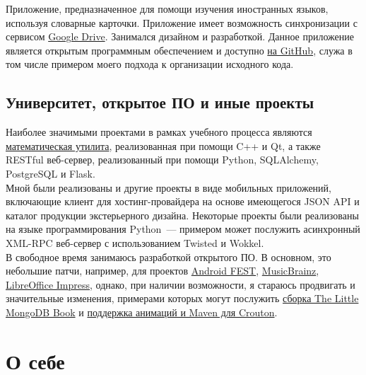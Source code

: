         Приложение, предназначенное для помощи изучения иностранных языков,
        используя словарные карточки. Приложение имеет возможность
        синхронизации с сервисом \href{https://drive.google.com}{Google Drive}.
        Занимался дизайном
        и разработкой. Данное приложение является открытым программным обеспечением
        и доступно \href{https://github.com/ming13/gambit}{на GitHub},
        служа в том числе примером моего подхода к организации исходного кода.

    \subsection*{Университет, открытое ПО и иные проекты}

      Наиболее значимыми проектами в рамках учебного процесса являются
      \href{https://github.com/ming13/aequatio}{математическая утилита},
      реализованная при помощи C++ и Qt, а также RESTful веб-сервер, реализованный
      при помощи Python, SQLAlchemy, PostgreSQL и Flask. \\

      Мной были реализованы и другие проекты в виде мобильных приложений,
      включающие клиент для хостинг-провайдера на основе имеющегося
      JSON API и каталог продукции экстерьерного дизайна.
      Некоторые проекты были реализованы на языке программирования Python~--- примером может послужить
      асинхронный XML-RPC веб-сервер с использованием Twisted и Wokkel. \\

      В свободное время занимаюсь разработкой открытого ПО.
      В основном, это небольшие патчи, например, для проектов
      \href{https://github.com/square/fest-android/commits?author=ming13}{Android FEST},
      \href{https://github.com/jdamcd/musicbrainz-android/commits?author=ming13}{MusicBrainz},
      \href{https://gerrit.libreoffice.org/#/q/owner:%22Artur+Dryomov%22+status:closed,n,z}{LibreOffice Impress},
      однако, при наличии возможности, я стараюсь продвигать и значительные изменения, примерами
      которых могут послужить
      \href{https://github.com/karlseguin/the-little-mongodb-book/pull/16}{сборка The Little MongoDB Book} и
      \href{https://github.com/keyboardsurfer/Crouton/pulls/ming13?state=closed}{поддержка анимаций и Maven для Crouton}.


  \section*{О себе}

